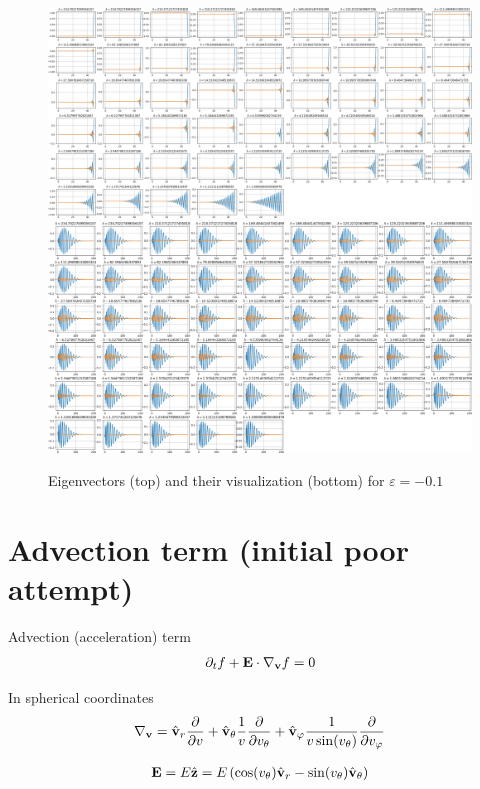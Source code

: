 \documentclass{article}[draft]
\begin{document}
\begin{figure}[H]
\centering
\includegraphics[width=1.2\textwidth]{dat/projection_neg_eigs.png}
\includegraphics[width=1.2\textwidth]{dat/projection_neg_eigs_visual.png}
\caption{Eigenvectors (top) and their visualization (bottom) for $\varepsilon = -0.1$}
\end{figure}

\clearpage
\section{Advection term (initial poor attempt)}
Advection (acceleration) term
\begin{align*}
\partial_t f + \mathbf{E}\cdot \nabla_{\mathbf{v}} f = 0
\end{align*}

In spherical coordinates
\begin{align*}
\nabla_{\vect{v}} 
= \vrunit \frac{\partial}{\partial \vr}
+ \vthetaunit \frac{1}{\vr} \frac{\partial}{\partial \vtheta}
+ \vphiunit \frac{1}{\vr \sin\of{\vtheta}} \frac{\partial}{\partial \vphi}
\end{align*}

\begin{align*}
\vect{E} 
= E \hat{\vect{z}} 
= E \left( \cos\of{\vtheta} \vrunit - \sin\of{\vtheta} \vthetaunit \right)
\end{align*}
\end{document}
